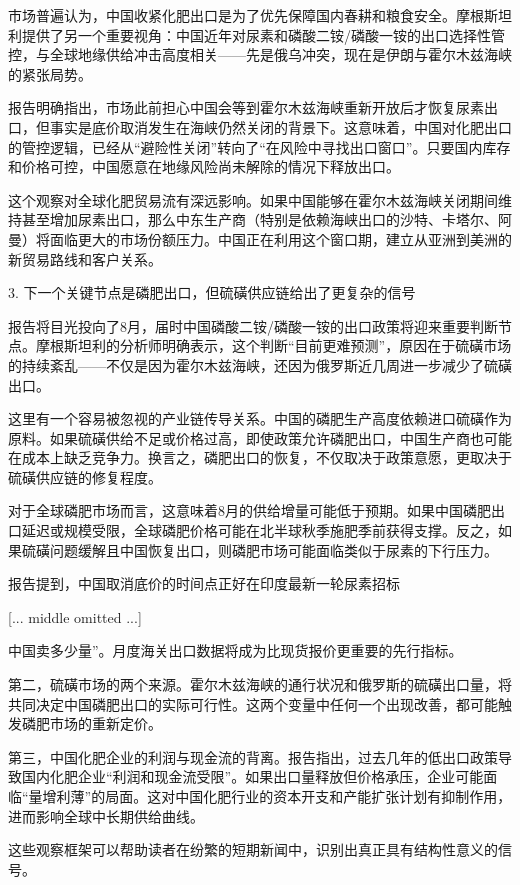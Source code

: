 \documentclass[11pt]{ctexart}
\begin{document}
市场普遍认为，中国收紧化肥出口是为了优先保障国内春耕和粮食安全。摩根斯坦利提供了另一个重要视角：中国近年对尿素和磷酸二铵/磷酸一铵的出口选择性管控，与全球地缘供给冲击高度相关——先是俄乌冲突，现在是伊朗与霍尔木兹海峡的紧张局势。

报告明确指出，市场此前担心中国会等到霍尔木兹海峡重新开放后才恢复尿素出口，但事实是底价取消发生在海峡仍然关闭的背景下。这意味着，中国对化肥出口的管控逻辑，已经从“避险性关闭”转向了“在风险中寻找出口窗口”。只要国内库存和价格可控，中国愿意在地缘风险尚未解除的情况下释放出口。

这个观察对全球化肥贸易流有深远影响。如果中国能够在霍尔木兹海峡关闭期间维持甚至增加尿素出口，那么中东生产商（特别是依赖海峡出口的沙特、卡塔尔、阿曼）将面临更大的市场份额压力。中国正在利用这个窗口期，建立从亚洲到美洲的新贸易路线和客户关系。

3. 下一个关键节点是磷肥出口，但硫磺供应链给出了更复杂的信号

报告将目光投向了8月，届时中国磷酸二铵/磷酸一铵的出口政策将迎来重要判断节点。摩根斯坦利的分析师明确表示，这个判断“目前更难预测”，原因在于硫磺市场的持续紊乱——不仅是因为霍尔木兹海峡，还因为俄罗斯近几周进一步减少了硫磺出口。

这里有一个容易被忽视的产业链传导关系。中国的磷肥生产高度依赖进口硫磺作为原料。如果硫磺供给不足或价格过高，即使政策允许磷肥出口，中国生产商也可能在成本上缺乏竞争力。换言之，磷肥出口的恢复，不仅取决于政策意愿，更取决于硫磺供应链的修复程度。

对于全球磷肥市场而言，这意味着8月的供给增量可能低于预期。如果中国磷肥出口延迟或规模受限，全球磷肥价格可能在北半球秋季施肥季前获得支撑。反之，如果硫磺问题缓解且中国恢复出口，则磷肥市场可能面临类似于尿素的下行压力。

报告提到，中国取消底价的时间点正好在印度最新一轮尿素招标

[... middle omitted ...]

中国卖多少量”。月度海关出口数据将成为比现货报价更重要的先行指标。

第二，硫磺市场的两个来源。霍尔木兹海峡的通行状况和俄罗斯的硫磺出口量，将共同决定中国磷肥出口的实际可行性。这两个变量中任何一个出现改善，都可能触发磷肥市场的重新定价。

第三，中国化肥企业的利润与现金流的背离。报告指出，过去几年的低出口政策导致国内化肥企业“利润和现金流受限”。如果出口量释放但价格承压，企业可能面临“量增利薄”的局面。这对中国化肥行业的资本开支和产能扩张计划有抑制作用，进而影响全球中长期供给曲线。

这些观察框架可以帮助读者在纷繁的短期新闻中，识别出真正具有结构性意义的信号。
\end{document}
